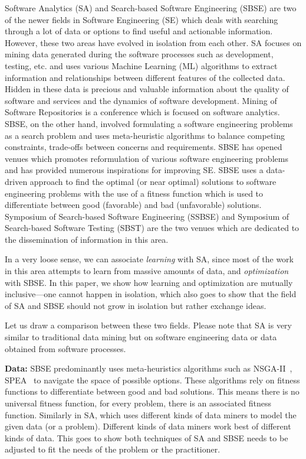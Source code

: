 \documentclass[table, xcdraw, sigconf,review, anonymous]{acmart}
\begin{document}
Software Analytics (SA) and Search-based Software Engineering (SBSE) are two of the newer fields in Software Engineering (SE) which deals with searching through a lot of data or options to find useful and actionable information. However, these two areas have evolved in isolation from each other. 
SA focuses on mining data generated during the software processes such as development, testing, etc. and uses various Machine Learning (ML) algorithms to extract information and relationships between different features of the collected data. 
Hidden in these data is precious and valuable information about the quality of software and services and the dynamics of software development. Mining of Software Repositories is a conference which is focused on software analytics. SBSE, on the other hand, involved formulating a software engineering problems as a search problem and uses meta-heuristic algorithms to balance competing constraints, trade-offs between concerns and requirements. SBSE has opened venues which promotes reformulation of various software engineering problems and has provided numerous inspirations for improving SE.  SBSE uses a data-driven approach to find the optimal (or near optimal) solutions to software engineering problems with the use of a fitness function which is used to differentiate between good (favorable) and bad (unfavorable) solutions. Symposium of Search-based Software Engineering (SSBSE) and Symposium of Search-based Software Testing (SBST) are the two venues which are dedicated to the dissemination of information in this area.

In a very loose sense, we can associate \textit{learning} with SA, since most of the work in this area attempts to learn from massive amounts of data, and \textit{optimization} with SBSE. In this paper, we show how learning and optimization are mutually inclusive---one cannot happen in isolation, which also goes to show that the field of SA and SBSE should not grow in isolation but rather exchange ideas.  

Let us draw a comparison between these two fields. Please note that SA is very similar to traditional data mining but on software engineering data or data obtained from software processes. 

\noindent\textbf{Data:} SBSE predominantly uses meta-heuristics algorithms such as NSGA-II~\cite{deb2000fast}, SPEA~\cite{zitzler2001spea2} to navigate the space of possible options. These algorithms rely on fitness functions to differentiate between good and bad solutions. This means there is no universal fitness function, for every problem, there is an associated fitness function. Similarly in SA, which uses different kinds of data miners to model the given data (or a problem). Different kinds of data miners work best of different kinds of data. This goes to show both techniques of SA and SBSE needs to be adjusted to fit the needs of the problem or the practitioner. 
\end{document}
